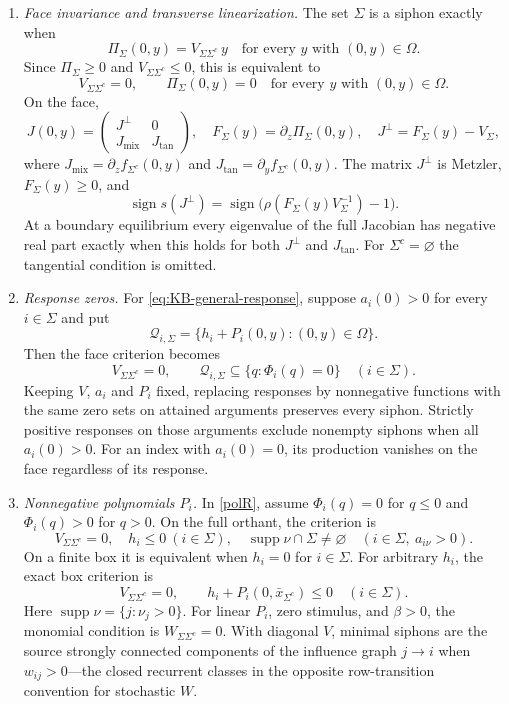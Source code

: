\begin{enumerate}
\item \emph{Face invariance and transverse linearization.}
The set $\Sigma$ is a siphon exactly when
\begin{equation}\label{eq:KB-face-general}
 \Pi_\Sigma(0,y)=V_{\Sigma\Sigma^c}\,y\quad\text{for every }y\text{ with }(0,y)\in\Omega.
\end{equation}
Since $\Pi_\Sigma\ge0$ and $V_{\Sigma\Sigma^c}\le0$, this is equivalent to
\begin{equation}\label{eq:KB-face}
 V_{\Sigma\Sigma^c}=0,\qquad \Pi_\Sigma(0,y)=0\quad\text{for every }y\text{ with }(0,y)\in\Omega.
\end{equation}
On the face,
\[
 J(0,y)=\begin{pmatrix}J^\perp&0\\J_{\mathrm{mix}}&J_{\mathrm{tan}}\end{pmatrix},
 \quad F_\Sigma(y)=\partial_z\Pi_\Sigma(0,y),\quad
 J^\perp=F_\Sigma(y)-V_\Sigma,
\]
where $J_{\mathrm{mix}}=\partial_zf_{\Sigma^c}(0,y)$ and
$J_{\mathrm{tan}}=\partial_yf_{\Sigma^c}(0,y)$.
The matrix $J^\perp$ is Metzler, $F_\Sigma(y)\ge0$, and
\[
 \operatorname{sign}s(J^\perp)
 =\operatorname{sign}\bigl(\rho(F_\Sigma(y)V_\Sigma^{-1})-1\bigr).
\]
At a
boundary equilibrium every eigenvalue of the full Jacobian has negative
real part exactly when this holds for both $J^\perp$ and
$J_{\mathrm{tan}}$. For $\Sigma^c=\varnothing$ the tangential condition is omitted.

\item \emph{Response zeros.} For \eqref{eq:KB-general-response}, suppose
$a_i(0)>0$ for every $i\in \Sigma$ and put
\[
 \mathcal Q_{i,\Sigma}=\{h_i+P_i(0,y):(0,y)\in\Omega\}.
\]
Then the face criterion becomes
\begin{equation}\label{eq:KB-response-zero-test}
 V_{\Sigma\Sigma^c}=0,\qquad
 \mathcal Q_{i,\Sigma}\subseteq\{q:\Phi_i(q)=0\}\quad(i\in \Sigma).
\end{equation}
Keeping $V$, $a_i$ and $P_i$ fixed, replacing responses by
nonnegative functions with the same zero sets
on attained arguments preserves every siphon. Strictly positive responses
on those arguments exclude nonempty siphons when all $a_i(0)>0$.
For an index with $a_i(0)=0$, its production vanishes on the face
regardless of its response.

\item \emph{Nonnegative polynomials $P_i$.} In \eqref{polR},
assume $\Phi_i(q)=0$ for $q\le0$ and $\Phi_i(q)>0$ for $q>0$.
On the full orthant, the criterion is
\[
 V_{\Sigma\Sigma^c}=0,\quad h_i\le0\ (i\in \Sigma),\quad
 \operatorname{supp}\nu\cap \Sigma\ne\varnothing
 \quad(i\in \Sigma,\ a_{i\nu}>0).
\]
On a finite box it is equivalent when $h_i=0$ for $i\in \Sigma$.
For arbitrary $h_i$, the exact box criterion is
\[
 V_{\Sigma\Sigma^c}=0,\qquad h_i+P_i(0,\bar x_{\Sigma^c})\le0\quad(i\in \Sigma).
\]
Here $\operatorname{supp}\nu=\{j:\nu_j>0\}$. For linear $P_i$, zero stimulus,
and $\beta>0$, the monomial condition is $W_{\Sigma\Sigma^c}=0$.
With diagonal $V$, minimal siphons are the source strongly connected
components of the influence graph $j\to i$ when $w_{ij}>0$---the closed
recurrent classes in the opposite row-transition convention for stochastic $W$.


\end{enumerate}
